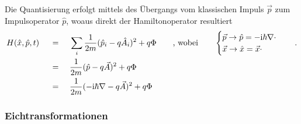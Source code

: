 \documentclass[a4paper,11pt, twoside]{article}
\newcommand{\+}{\dagger}
\renewcommand{\'}{\tt\textquotesingle}
\renewcommand{\v}{\vec}
\renewcommand{\^}{\hat}
\renewcommand{\tt}{\text}
\renewcommand{\~}{\widetilde}
\begin{document}
Die Quantisierung erfolgt mittels des Übergangs vom klassischen Impuls $\v p$ zum Impulsoperator $\^p$, woaus direkt der Hamiltonoperator resultiert
\begin{alignat*}{5}
& H(\^ x,\^ p,t)&& \ =\  && \sum_i \frac{1}{2m}(\^ p_i-q \^A_i)^2+q\Phi  &&\quad \tt{, wobei}\quad &&
\begin{cases}
   \v p \rightarrow \^p=-\tt i \hbar \nabla\cdot \\
     \v x \rightarrow \^x=\v x \cdot  
\end{cases} \quad. \\
& && \ = \ && \frac{1}{2m}(\^ p -q \v A)^2+q\Phi &&  &&  \\
& && \ = \ && \frac{1}{2m}(-\tt i \hbar \nabla -q \v A)^2+q\Phi 
\end{alignat*}
\subsubsection{Eichtransformationen}
\end{document}
